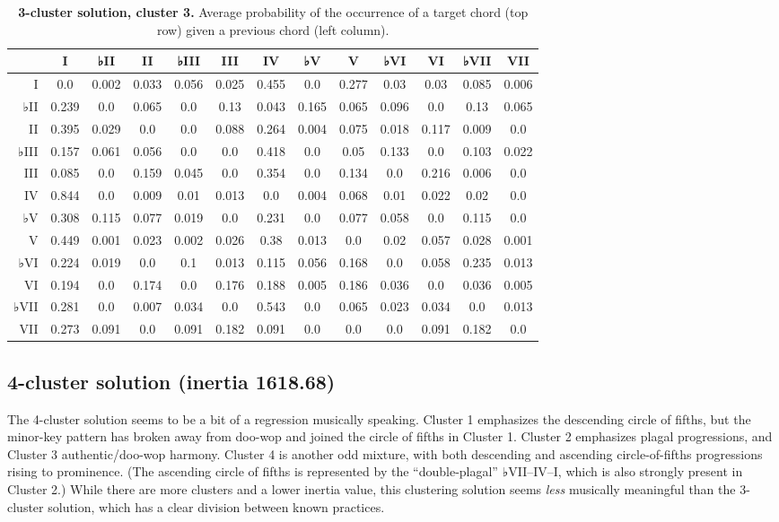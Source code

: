 \begin{table}[htbp]
\begin{minipage}{\linewidth}
\setlength{\tymax}{0.5\linewidth}
\centering
\small
\caption{\textbf{3-cluster solution, cluster 3.} Average probability of the occurrence of a target chord (top row) given a previous chord (left column).}
\label{3-clustersolutioncluster3.averageprobabilityoftheoccurrenceofatargetchordtoprowgivenapreviouschordleftcolumn.}
\begin{tabulary}{\textwidth}{@{}RCCCCCCCCCCCC@{}} \toprule
&I&♭II&II&♭III&III&IV&♭V&V&♭VI&VI&♭VII&VII\\
\midrule
I&0.0&0.002&0.033&0.056&0.025&0.455&0.0&0.277&0.03&0.03&0.085&0.006\\
♭II&0.239&0.0&0.065&0.0&0.13&0.043&0.165&0.065&0.096&0.0&0.13&0.065\\
II&0.395&0.029&0.0&0.0&0.088&0.264&0.004&0.075&0.018&0.117&0.009&0.0\\
♭III&0.157&0.061&0.056&0.0&0.0&0.418&0.0&0.05&0.133&0.0&0.103&0.022\\
III&0.085&0.0&0.159&0.045&0.0&0.354&0.0&0.134&0.0&0.216&0.006&0.0\\
IV&0.844&0.0&0.009&0.01&0.013&0.0&0.004&0.068&0.01&0.022&0.02&0.0\\
♭V&0.308&0.115&0.077&0.019&0.0&0.231&0.0&0.077&0.058&0.0&0.115&0.0\\
V&0.449&0.001&0.023&0.002&0.026&0.38&0.013&0.0&0.02&0.057&0.028&0.001\\
♭VI&0.224&0.019&0.0&0.1&0.013&0.115&0.056&0.168&0.0&0.058&0.235&0.013\\
VI&0.194&0.0&0.174&0.0&0.176&0.188&0.005&0.186&0.036&0.0&0.036&0.005\\
♭VII&0.281&0.0&0.007&0.034&0.0&0.543&0.0&0.065&0.023&0.034&0.0&0.013\\
VII&0.273&0.091&0.0&0.091&0.182&0.091&0.0&0.0&0.0&0.091&0.182&0.0\\

\bottomrule

\end{tabulary}
\end{minipage}
\end{table}

\subsection{4-cluster solution (inertia 1618.68)}
\label{4-clustersolutioninertia1618.68}

The 4-cluster solution seems to be a bit of a regression musically speaking. Cluster 1 emphasizes the descending circle of fifths, but the minor-key pattern has broken away from doo-wop and joined the circle of fifths in Cluster 1. Cluster 2 emphasizes plagal progressions, and Cluster 3 authentic\slash doo-wop harmony. Cluster 4 is another odd mixture, with both descending and ascending circle-of-fifths progressions rising to prominence. (The ascending circle of fifths is represented by the ``double-plagal'' ♭VII–IV–I, which is also strongly present in Cluster 2.) While there are more clusters and a lower inertia value, this clustering solution seems \emph{less} musically meaningful than the 3-cluster solution, which has a clear division between known practices.

